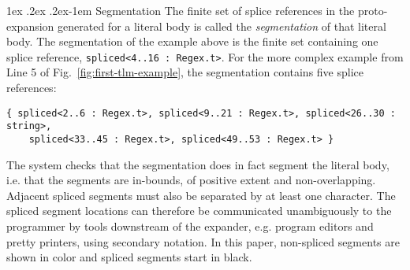 \documentclass[acmsmall,screen]{acmart}
\makeatletter
\renewcommand{\subsubsection}{%
  \@startsection{subsubsection}{3}%
  {\z@}{1ex \@plus .2ex \@minus .2ex}{-1em}%
  {\sffamily\normalsize\itshape\maybe@addperiod}%
}
\newcommand{\maybe@addperiod}[1]{%
  #1\@addpunct{.}%
}
\newcommand{\li}[1]{\lstinline[basicstyle=\ttfamily\fontsize{9pt}{1em}\selectfont]{#1}}
\newcommand{\lismall}[1]{\lstinline[basicstyle=\ttfamily\fontsize{9pt}{1em}\selectfont]{#1}}
\makeatother
\begin{document}

\subsubsection{Segmentation}\label{sec:segmentation}
The finite set of splice references in the proto-expansion generated for a literal body is called the \emph{segmentation} of that literal body. The segmentation of the example above is the finite set containing one splice reference, \lismall{spliced<4..16 : Regex.t>}. For the more complex example from Line 5 of Fig.~\ref{fig:first-tlm-example}, the segmentation contains five splice references:
\begin{lstlisting}[numbers=none]
  { spliced<2..6 : Regex.t>, spliced<9..21 : Regex.t>, spliced<26..30 : string>, 
    spliced<33..45 : Regex.t>, spliced<49..53 : Regex.t> } 
\end{lstlisting}
The system checks that the segmentation does in fact segment the literal body, i.e. that the segments are in-bounds, of positive extent and non-overlapping. Adjacent spliced segments must also be separated by at least one character. The spliced segment locations can therefore be communicated unambiguously to the programmer by tools downstream of the expander, e.g. program editors and pretty printers, using secondary notation. In this paper, non-spliced segments are shown in color and spliced segments start in black.  
\end{document}
